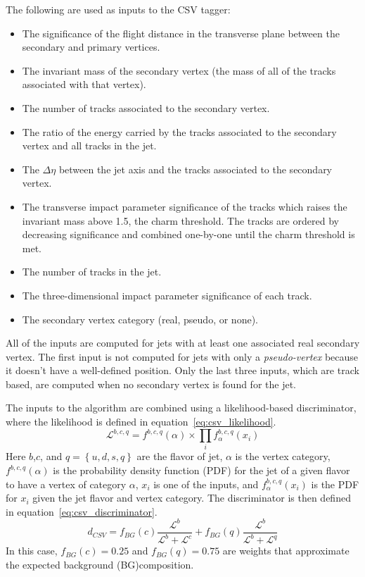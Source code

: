 The following are used as inputs to the CSV tagger:
\begin{itemize}
    \item The significance of the flight distance in the transverse plane between the secondary and primary vertices.
    \item The invariant mass of the secondary vertex (the mass of all of the tracks associated with that vertex).
    \item The number of tracks associated to the secondary vertex.
    \item The ratio of the energy carried by the tracks associated to the secondary vertex and all tracks in the jet.
    \item The $\Delta\eta$ between the jet axis and the tracks associated to the secondary vertex.
    \item The transverse impact parameter significance of the tracks which raises the invariant mass above 1.5\gev, the charm threshold. The tracks are ordered by decreasing significance and combined one-by-one until the charm threshold is met.
    \item The number of tracks in the jet.
    \item The three-dimensional impact parameter significance of each track.
    \item The secondary vertex category (real, pseudo, or none).
\end{itemize}
All of the inputs are computed for jets with at least one associated real secondary vertex. The first input is not computed for jets with only a \textit{pseudo-vertex} because it doesn't have a well-defined position. Only the last three inputs, which are track based, are computed when no secondary vertex is found for the jet.

The inputs to the algorithm are combined using a likelihood-based discriminator, where the likelihood is defined in equation~\ref{eq:csv_likelihood}.
\begin{equation}
\label{eq:csv_likelihood}
\mathcal{L}^{b,c,q}=f^{b,c,q}\left(\alpha\right)\times\prod_{i}f_{\alpha}^{b,c,q}\left(x_{i}\right)
\end{equation}
Here $b$,$c$, and $q=\left\{u,d,s,q\right\}$ are the flavor of jet, $\alpha$ is the vertex category, $f^{b,c,q}\left(\alpha\right)$ is the probability density function (PDF) for the jet of a given flavor to have a vertex of category $\alpha$, $x_{i}$ is one of the inputs, and $f_{\alpha}^{b,c,q}\left(x_{i}\right)$ is the PDF for $x_{i}$ given the jet flavor and vertex category. The discriminator is then defined in equation~\ref{eq:csv_discriminator}.
\begin{equation}
\label{eq:csv_discriminator}
d_{CSV}=f_{BG}\left(c\right)\frac{\mathcal{L}^{b}}{\mathcal{L}^{b}+\mathcal{L}^{c}}+f_{BG}\left(q\right)\frac{\mathcal{L}^{b}}{\mathcal{L}^{b}+\mathcal{L}^{q}}
\end{equation}
In this case, $f_{BG}\left(c\right)=0.25$ and $f_{BG}\left(q\right)=0.75$ are weights that approximate the expected background (BG)composition.

